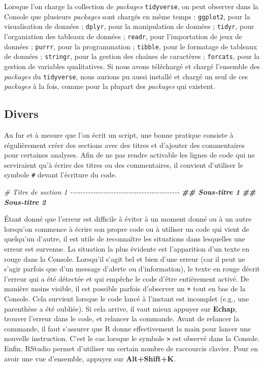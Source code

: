 \documentclass[
]{book}
\newenvironment{Shaded}{\begin{snugshade}}{\end{snugshade}}
\newcommand{\CommentTok}[1]{\textcolor[rgb]{0.56,0.35,0.01}{\textit{#1}}}
\newcommand{\DocumentationTok}[1]{\textcolor[rgb]{0.56,0.35,0.01}{\textbf{\textit{#1}}}}
\begin{document}
Lorsque l'on charge la collection de \emph{packages} \texttt{tidyverse}, on peut observer dans la Console que plusieurs \emph{packages} sont chargés en même temps : \texttt{ggplot2}, pour la visualisation de données ; \texttt{dplyr}, pour la manipulation de données ; \texttt{tidyr}, pour l'organiation des tableaux de données ; \texttt{readr}, pour l'importation de jeux de données ; \texttt{purrr}, pour la programmation ; \texttt{tibble}, pour le formatage de tableaux de données ; \texttt{stringr}, pour la gestion des chaînes de caractères ; \texttt{forcats}, pour la gestion de variables qualitatives. Si nous avons téléchargé et chargé l'ensemble des \emph{packages} du \texttt{tidyverse}, nous aurions pu aussi installé et chargé un seul de ces \emph{packages} à la fois, comme pour la plupart des \emph{packages} qui existent.

\hypertarget{divers}{%
\subsection{Divers}\label{divers}}

Au fur et à mesure que l'on écrit un script, une bonne pratique consiste à régulièrement créer des sections avec des titres et d'ajouter des commentaires pour certaines analyses. Afin de ne pas rendre activable les lignes de code qui ne serviraient qu'à écrire des titres ou des commentaires, il convient d'utiliser le symbole \texttt{\#} devant l'écriture du code.

\begin{Shaded}
\begin{Highlighting}[]
\CommentTok{\# Titre de section 1 {-}{-}{-}{-}{-}{-}{-}{-}{-}{-}{-}{-}{-}{-}{-}{-}{-}{-}{-}{-}{-}{-}{-}{-}{-}{-}{-}{-}{-}{-}{-}{-}{-}{-}{-}{-}{-}{-}{-}{-}{-}{-}{-}}
\DocumentationTok{\#\# Sous{-}titre 1}
\DocumentationTok{\#\# Sous{-}titre 2}
\end{Highlighting}
\end{Shaded}

Étant donné que l'erreur est difficile à éviter à un moment donné ou à un autre lorsqu'on commence à écrire son propre code ou à utiliser un code qui vient de quelqu'un d'autre, il est utile de reconnaître les situations dans lesquelles une erreur est survenue. La situation la plus évidente est l'apparition d'un texte en rouge dans la Console. Lorsqu'il s'agit bel et bien d'une erreur (car il peut ne s'agir parfois que d'un message d'alerte ou d'information), le texte en rouge décrit l'erreur qui a été détectée et qui empêche le code d'être entièrement activé. De manière moins visible, il est possible parfois d'observer un \texttt{+} tout en bas de la Console. Cela survient lorsque le code lancé à l'instant est incomplet (e.g., une parenthèse a été oubliée). Si cela arrive, il vaut mieux appuyer sur \textbf{Echap}, trouver l'erreur dans le code, et relancer la commande. Avant de relancer la commande, il faut s'assurer que R donne effectivement la main pour lancer une nouvelle instruction. C'est le cas lorsque le symbole \texttt{\textgreater{}} est observé dans la Console. Enfin, RStudio permet d'utiliser un certain nombre de raccourcis clavier. Pour en avoir une vue d'ensemble, appuyez sur \textbf{Alt+Shift+K}.
\end{document}

